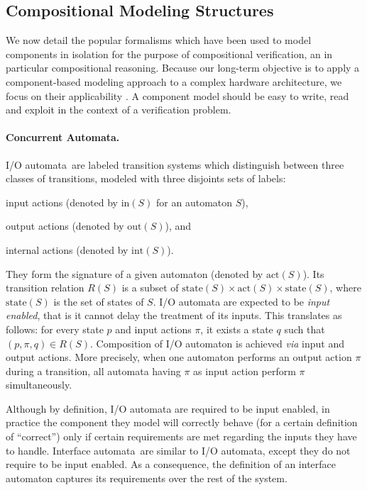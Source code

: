 \subsection{Compositional Modeling Structures}
\label{subsec:sota:compmod}

We now detail the popular formalisms which have been used to model components in
isolation for the purpose of compositional verification, an in particular
compositional reasoning.
%
Because our long-term objective is to apply a component-based modeling approach
to a complex hardware architecture, we focus on their applicability .
%
A component model should be easy to write, read and exploit in the context of a
verification problem.

\paragraph{Concurrent Automata.}
%
I/O automata\,\cite{lynch1988ioautomata} are labeled transition systems which
distinguish between three classes of transitions, modeled with three disjoints
sets of labels:
%
\begin{inparaenum}[(1)]
\item input actions (denoted by \( \mathrm{in}(S) \) for an automaton \( S \)),
\item output actions (denoted by \( \mathrm{out}(S) \)), and
\item internal actions (denoted by \( \mathrm{int}(S) \)).
\end{inparaenum}
%
They form the signature of a given automaton (denoted by \( \mathrm{act}(S) \)).
%
Its transition relation \( R(S) \) is a subset of
\( \mathrm{state}(S) \times \mathrm{act}(S) \times \mathrm{state}(S) \), where
\( \mathrm{state}(S) \) is the set of states of \( S \).
%
I/O automata are expected to be \emph{input enabled}, that is it cannot delay
the treatment of its inputs.
%
This translates as follows: for every state \( p \) and input actions \( \pi \),
it exists a state \( q \) such that \( (p, \pi, q) \in R(S) \).
%
Composition of I/O automaton is achieved \emph{via} input and output actions.
%
More precisely, when one automaton performs an output action \( \pi \) during a
transition, all automata having \( \pi \) as input action perform \( \pi \)
simultaneously.

Although by definition, I/O automata are required to be input enabled, in
practice the component they model will correctly behave (for a certain
definition of ``correct'') only if certain requirements are met regarding the
inputs they have to handle.
%
Interface automata\,\cite{de2001interfaceautomata} are similar to I/O automata,
except they do not require to be input enabled.
%
As a consequence, the definition of an interface automaton captures its
requirements over the rest of the system. 

